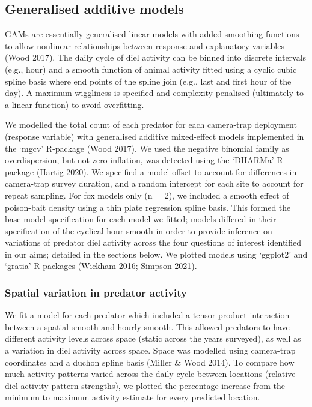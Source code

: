 \documentclass[11pt,a4paper,titlepage,twoside,openright]{style/unimelbthesis}
\begin{document}
\begin{mainmatter}
\hypertarget{generalised-additive-models-2}{%
\subsection{Generalised additive models}\label{generalised-additive-models-2}}

GAMs are essentially generalised linear models with added smoothing functions to allow nonlinear relationships between response and explanatory variables (Wood 2017). The daily cycle of diel activity can be binned into discrete intervals (e.g., hour) and a smooth function of animal activity fitted using a cyclic cubic spline basis where end points of the spline join (e.g., last and first hour of the day). A maximum wiggliness is specified and complexity penalised (ultimately to a linear function) to avoid overfitting.

We modelled the total count of each predator for each camera-trap deployment (response variable) with generalised additive mixed-effect models implemented in the `mgcv' R-package (Wood 2017). We used the negative binomial family as overdispersion, but not zero-inflation, was detected using the `DHARMa' R-package (Hartig 2020). We specified a model offset to account for differences in camera-trap survey duration, and a random intercept for each site to account for repeat sampling. For fox models only (n = 2), we included a smooth effect of poison-bait density using a thin plate regression spline basis. This formed the base model specification for each model we fitted; models differed in their specification of the cyclical hour smooth in order to provide inference on variations of predator diel activity across the four questions of interest identified in our aims; detailed in the sections below. We plotted models using `ggplot2' and `gratia' R-packages (Wickham 2016; Simpson 2021).

\hypertarget{spatial-variation-in-predator-activity}{%
\subsubsection{Spatial variation in predator activity}\label{spatial-variation-in-predator-activity}}

We fit a model for each predator which included a tensor product interaction between a spatial smooth and hourly smooth. This allowed predators to have different activity levels across space (static across the years surveyed), as well as a variation in diel activity across space. Space was modelled using camera-trap coordinates and a duchon spline basis (Miller \& Wood 2014). To compare how much activity patterns varied across the daily cycle between locations (relative diel activity pattern strengths), we plotted the percentage increase from the minimum to maximum activity estimate for every predicted location.


\end{mainmatter}
\end{document}

